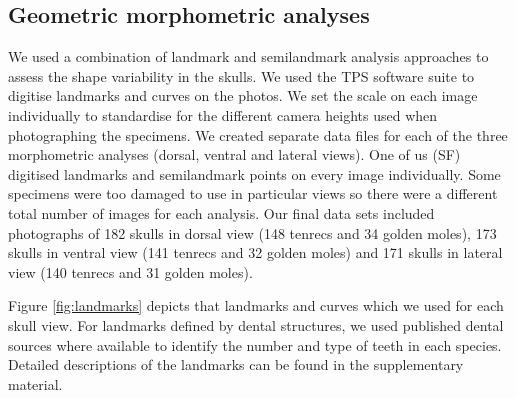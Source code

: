 \documentclass[12pt,a4paper]{article}
\begin{document}
\subsection{Geometric morphometric analyses}

	We used a combination of landmark and semilandmark analysis approaches to assess the shape variability in the skulls.  We used the TPS software suite \citep{Rohlf2013} to digitise landmarks and curves on the photos. We set the scale on each image individually to standardise for the different camera heights used when photographing the specimens. We created separate data files for each of the three morphometric analyses (dorsal, ventral and lateral views). One of us (SF) digitised landmarks and semilandmark points on every image individually. Some specimens were too damaged to use in particular views so there were a different total number of images for each analysis. Our final data sets included photographs of 182 skulls in dorsal view (148 tenrecs and 34 golden moles), 173 skulls in ventral view (141 tenrecs and 32 golden moles) and 171 skulls in lateral view (140 tenrecs and 31 golden moles).

	Figure \ref{fig:landmarks} depicts that landmarks and curves which we used for each skull view. For landmarks defined by dental structures, we used published dental sources \citep{Repenning1967, Eisenberg1969, Nowak1983, MacPhee1987, KnoxJones1992, Davis1997, Querouil2001, Nagorsen2002, Wilson2005, Goodman2006, Karatas2007, Hoffmann2008, Asher2008,  Muldoon2009, Lin2010} where available to identify the number and type of teeth in each species. Detailed descriptions of the landmarks can be found in the supplementary material.
	
\end{document}
